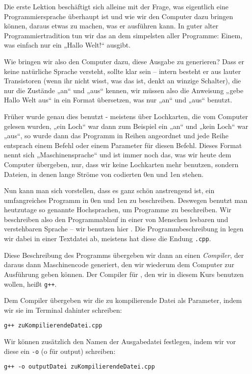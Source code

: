 
Die erste Lektion beschäftigt sich alleine mit der Frage, was eigentlich eine
Programmiersprache überhaupt ist und wie wir den Computer dazu bringen können,
daraus etwas zu machen, was er ausführen kann.  In guter alter
Programmiertradition tun wir das an dem simpelsten aller Programme: Einem, was
einfach nur ein „Hallo Welt!“ ausgibt.

Wie bringen wir also den Computer dazu, diese Ausgabe zu generieren? Dass er
keine natürliche Sprache versteht, sollte klar sein -- intern besteht er aus
lauter Transistoren (wenn ihr nicht wisst, was das ist, denkt an winzige
Schalter), die nur die Zustände „an“ und „aus“ kennen, wir müssen also die
Anweisung „gebe Hallo Welt aus“ in ein Format übersetzen, was nur „an“ und
„aus“ benutzt.

Früher wurde genau dies benutzt - meistens über Lochkarten, die vom Computer
gelesen wurden, „ein Loch“ war dann zum Beispiel ein „an“ und „kein Loch“ war
„aus“, so wurde dann das Programm in Reihen angeordnet und jede Reihe entsprach
einem Befehl oder einem Parameter für diesen Befehl.  Dieses Format nennt sich
„Maschinensprache“ und ist immer noch das, was wir heute dem Computer
übergeben, nur, dass wir keine Lochkarten mehr benutzen, sondern Dateien, in
denen lange Ströme von codierten 0en und 1en stehen.

Nun kann man sich vorstellen, dass es ganz schön anstrengend ist, ein
umfangreiches Programm in 0en und 1en zu beschreiben. Deswegen benutzt man
heutzutage so genannte Hochsprachen, um Programme zu beschreiben. Wir
beschreiben also den Programmablauf in einer von Menschen lesbaren und
verstehbaren Sprache -- wir benutzen hier \Cpp.  Die Programmbeschreibung in
\Cpp legen wir dabei in einer Textdatei ab, meistens hat diese die Endung
\texttt{.cpp}.

Diese Beschreibung des Programms übergeben wir dann an einen \emph{Compiler},
der daraus dann Maschinencode generiert, den wir wiederum dem Computer zur
Ausführung geben können.  Der Compiler für \Cpp, den wir in diesem Kurs
benutzen wollen, heißt \texttt{g++}.

Dem Compiler übergeben wir die zu kompilierende Datei als Parameter, indem wir
sie im Terminal dahinter schreiben:
\begin{center}
\texttt{g++ zuKompilierendeDatei.cpp}
\end{center}
Wir können zusätzlich den Namen der Ausgabedatei festlegen, indem wir vor diese
ein \texttt{-o} (o für output) schreiben:
\begin{center}
\texttt{g++ -o outputDatei zuKompilierendeDatei.cpp}
\end{center}

